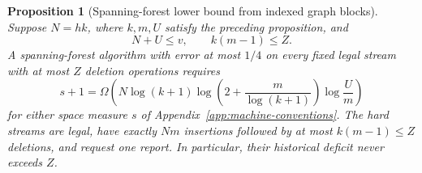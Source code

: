 \documentclass[11pt,letterpaper]{article}
\newtheorem{proposition}[theorem]{Proposition}
\numberwithin{equation}{section}
\begin{document}
\begin{proposition}[Spanning-forest lower bound from indexed graph blocks]
\label{prop:indexed-block-forest}
Suppose $N=hk$, where $k,m,U$ satisfy the preceding proposition, and
\[
 N+U\le v,\qquad k(m-1)\le Z.
\]
A spanning-forest algorithm with error at most $1/4$ on every fixed legal stream with at most $Z$ deletion operations requires
\begin{equation}
s+1=\Omega\!\left(
  N\log(k+1)\log\left(2+\frac m{\log(k+1)}\right)\log\frac Um
 \right)
 \label{eq:bi11}
\end{equation}
for either space measure $s$ of Appendix~\ref{app:machine-conventions}.
The hard streams are legal, have exactly $Nm$ insertions followed by at most $k(m-1)\le Z$ deletions, and request one report.
In particular, their historical deficit never exceeds $Z$.
\end{proposition}
\end{document}
